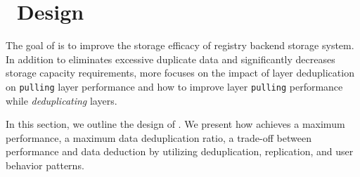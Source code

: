 \section{\sysname~Design}
\label{sec:Sift}

%




The goal of \sysname is to improve the storage efficacy of registry backend storage system.
In addition to eliminates excessive duplicate data and 
significantly decreases storage capacity requirements,
\sysname more focuses on the impact of layer deduplication on \texttt{pulling} layer performance
and how to improve layer \texttt{pulling} performance while \emph{deduplicating} layers.

In this section, we outline the design of \sysname.
We present how \sysname achieves 
a maximum performance, 
a maximum data deduplication ratio, 
a trade-off between performance and data deduction
by utilizing deduplication, replication, and user behavior patterns.








